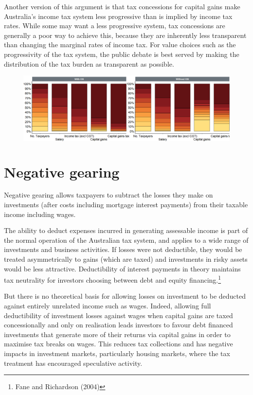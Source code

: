 \documentclass{grattan}\usepackage[]{graphicx}\usepackage[]{color}
\begin{document}
Another version of this argument is that tax concessions for capital gains make Australia's income tax system less progressive than is implied by income tax rates. While some may want a less progressive system, tax concessions are generally a poor way to achieve this, because they are inherently less transparent than changing the marginal rates of income tax. For value choices such as the progressivity of the tax system, the public debate is best served by making the distribution of the tax burden as transparent as possible.




\begin{figure}
\includegraphics[width = \textwidth]{CGT-NG-atlas//stacked-column-chart-1}
\the\textwidth
\end{figure}


\chapter{Negative gearing}
Negative gearing allows taxpayers to subtract the losses they make on
investments (after costs including mortgage interest payments) from
their taxable income including wages.

The ability to deduct expenses incurred in generating assessable income
is part of the normal operation of the Australian tax system, and
applies to a wide range of investments and business activities. If
losses were not deductible, they would be treated asymmetrically to
gains (which are taxed) and investments in risky assets would be less
attractive. Deductibility of interest payments in theory maintains tax
neutrality for investors choosing between debt and equity
financing.\footnote{Fane and Richardson (2004)}

But there is no theoretical basis for allowing losses on investment to
be deducted against entirely unrelated income such as wages. Indeed,
allowing full deductibility of investment losses against wages when
capital gains are taxed concessionally and only on realisation leads
investors to favour debt financed investments that generate more of
their returns via capital gains in order to maximise tax breaks on
wages. This reduces tax collections and has negative impacts in
investment markets, particularly housing markets, where the tax
treatment has encouraged speculative activity.
\end{document}
